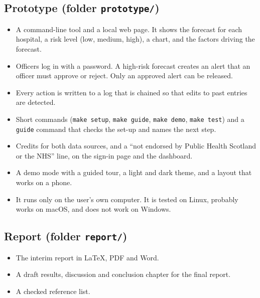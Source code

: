 \documentclass[11pt,a4paper]{article}
\newcommand{\file}[1]{\texttt{\small #1}}
\begin{document}
\subsection{Prototype (folder \file{prototype/})}
\begin{itemize}
\item A command-line tool and a local web page. It shows the forecast for each hospital, a risk level (low, medium, high), a chart, and the factors driving the forecast.
\item Officers log in with a password. A high-risk forecast creates an alert that an officer must approve or reject. Only an approved alert can be released.
\item Every action is written to a log that is chained so that edits to past entries are detected.
\item Short commands (\texttt{make setup}, \texttt{make guide}, \texttt{make demo}, \texttt{make test}) and a \texttt{guide} command that checks the set-up and names the next step.
\item Credits for both data sources, and a ``not endorsed by Public Health Scotland or the NHS'' line, on the sign-in page and the dashboard.
\item A demo mode with a guided tour, a light and dark theme, and a layout that works on a phone.
\item It runs only on the user's own computer. It is tested on Linux, probably works on macOS, and does not work on Windows.
\end{itemize}

\subsection{Report (folder \file{report/})}
\begin{itemize}
\item The interim report in LaTeX, PDF and Word.
\item A draft results, discussion and conclusion chapter for the final report.
\item A checked reference list.
\end{itemize}
\end{document}
